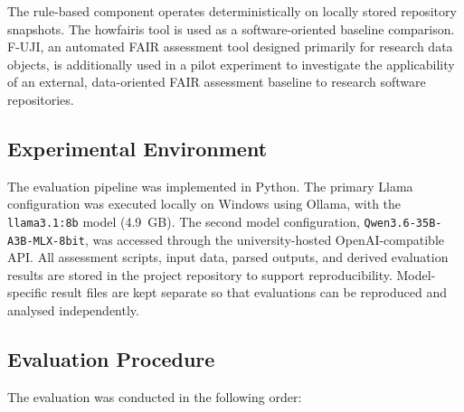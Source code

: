 The rule-based component operates deterministically on locally stored
repository snapshots. The howfairis tool is used as a software-oriented
baseline comparison. F-UJI, an automated FAIR assessment tool designed
primarily for research data objects, is additionally used in a pilot
experiment to investigate the applicability of an external,
data-oriented FAIR assessment baseline to research software
repositories.

\subsection{Experimental Environment}

The evaluation pipeline was implemented in Python. The primary Llama
configuration was executed locally on Windows using Ollama, with the
\texttt{llama3.1:8b} model (4.9~GB). The second model configuration,
\texttt{Qwen3.6-35B-A3B-MLX-8bit}, was accessed through the
university-hosted OpenAI-compatible API. All assessment scripts, input
data, parsed outputs, and derived evaluation results are stored in the
project repository to support reproducibility. Model-specific result
files are kept separate so that evaluations can be reproduced and
analysed independently.


\subsection{Evaluation Procedure}

The evaluation was conducted in the following order:

